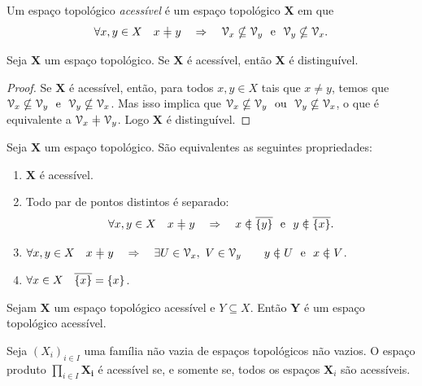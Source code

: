 \begin{definition}[$T_1$]
Um espaço topológico \emph{acessível} é um espaço topológico $\bm X$ em que
	\begin{equation*}
	\forall x,y \in X \quad x \neq y \quad \Rightarrow \quad \viz_x \nsubseteq \viz_y \e \viz_y \nsubseteq \viz_x.
	\end{equation*}
\end{definition}

\begin{proposition}[$T_1 \Rightarrow T_0$]
Seja $\bm X$ um espaço topológico. Se $\bm X$ é acessível, então $\bm X$ é distinguível.
\end{proposition}
\begin{proof}
Se $\bm X$ é acessível, então, para todos $x,y \in X$ tais que $x \neq y$, temos que $\mathcal{V}_x \nsubseteq \mathcal{V}_y \text{\ \ e\ \ } \mathcal{V}_y \nsubseteq \mathcal{V}_x$. Mas isso implica que $\mathcal{V}_x \nsubseteq \mathcal{V}_y \text{\ \ ou\ \ } \mathcal{V}_y \nsubseteq \mathcal{V}_x$, o que é equivalente a $\viz_x \neq \viz_y$. Logo $\bm X$ é distinguível.
\end{proof}

\begin{proposition}
Seja $\bm X$ um espaço topológico. São equivalentes as seguintes propriedades:
	\begin{enumerate}
	\item $\bm X$ é acessível.
	\item Todo par de pontos distintos é separado:
		\begin{equation*}
		\forall x,y \in X \quad x \neq y \quad \Rightarrow \quad x \notin \Fec{\{y\}} \e y \notin \Fec{\{x\}}.
		\end{equation*}
	\item $\forall x,y \in X \quad x \neq y \quad \Rightarrow \quad \exists U \in \viz_x,\ V \in \viz_y \qquad y \notin U \e x \notin V$.
	\item $\forall x \in X \quad \overline{\{x\}}=\{x\}$.
	\end{enumerate}
\end{proposition}

\begin{proposition}
Sejam $\bm X$ um espaço topológico acessível e  $Y \subseteq X$. Então $\bm Y$ é um espaço topológico acessível.
\end{proposition}

\begin{proposition}
Seja $(X_i)_{i \in I}$ uma família não vazia de espaços topológicos não vazios. O espaço produto $\prod_{i \in I} \bm{X_i}$ é acessível se, e somente se, todos os espaços $\bm X_i$ são acessíveis.
\end{proposition}

